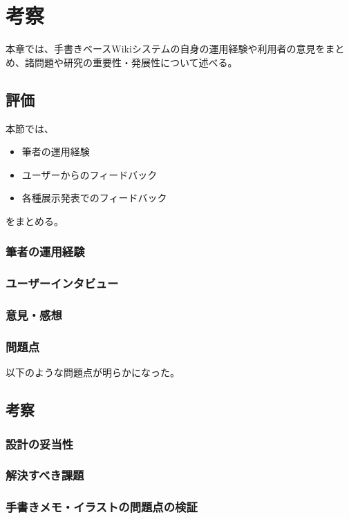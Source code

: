 \chapter{考察}
\label{chap:kosatsu}

本章では、手書きベースWikiシステムの自身の運用経験や利用者の意見をまとめ、諸問題や研究の重要性・発展性について述べる。

\newpage

\section{評価}
本節では、
\begin{itemize}
    \item 筆者の運用経験
    \item ユーザーからのフィードバック
    \item 各種展示発表でのフィードバック
\end{itemize}
をまとめる。

\subsection{筆者の運用経験}

\subsection{ユーザーインタビュー}

\subsection{意見・感想}

\subsection{問題点}
以下のような問題点が明らかになった。


\section{考察}

\subsection{設計の妥当性}

\subsection{解決すべき課題}

\subsection{手書きメモ・イラストの問題点の検証}


